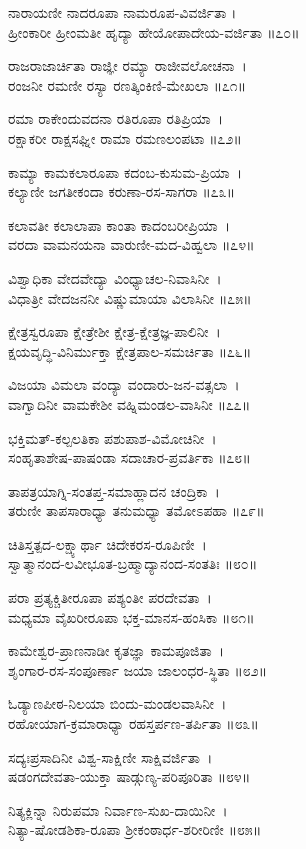 ನಾರಾಯಣೀ ನಾದರೂಪಾ ನಾಮರೂಪ-ವಿವರ್ಜಿತಾ ।\\
ಹ್ರೀಂಕಾರೀ ಹ್ರೀಂಮತೀ ಹೃದ್ಯಾ ಹೇಯೋಪಾದೇಯ-ವರ್ಜಿತಾ ॥೭೦॥

ರಾಜರಾಜಾರ್ಚಿತಾ ರಾಜ್ಞೀ ರಮ್ಯಾ ರಾಜೀವಲೋಚನಾ~।\\
ರಂಜನೀ ರಮಣೀ ರಸ್ಯಾ ರಣತ್ಕಿಂಕಿಣಿ-ಮೇಖಲಾ ॥೭೧॥

ರಮಾ ರಾಕೇಂದುವದನಾ ರತಿರೂಪಾ ರತಿಪ್ರಿಯಾ~।\\
ರಕ್ಷಾಕರೀ ರಾಕ್ಷಸಘ್ನೀ ರಾಮಾ ರಮಣಲಂಪಟಾ ॥೭೨॥

ಕಾಮ್ಯಾ ಕಾಮಕಲಾರೂಪಾ ಕದಂಬ-ಕುಸುಮ-ಪ್ರಿಯಾ~।\\
ಕಲ್ಯಾಣೀ ಜಗತೀಕಂದಾ ಕರುಣಾ-ರಸ-ಸಾಗರಾ ॥೭೩॥

ಕಲಾವತೀ ಕಲಾಲಾಪಾ ಕಾಂತಾ ಕಾದಂಬರೀಪ್ರಿಯಾ~।\\
ವರದಾ ವಾಮನಯನಾ ವಾರುಣೀ-ಮದ-ವಿಹ್ವಲಾ ॥೭೪॥

ವಿಶ್ವಾಧಿಕಾ ವೇದವೇದ್ಯಾ ವಿಂಧ್ಯಾಚಲ-ನಿವಾಸಿನೀ~।\\
ವಿಧಾತ್ರೀ ವೇದಜನನೀ ವಿಷ್ಣುಮಾಯಾ ವಿಲಾಸಿನೀ ॥೭೫॥

ಕ್ಷೇತ್ರಸ್ವರೂಪಾ ಕ್ಷೇತ್ರೇಶೀ ಕ್ಷೇತ್ರ-ಕ್ಷೇತ್ರಜ್ಞ-ಪಾಲಿನೀ~।\\
ಕ್ಷಯವೃದ್ಧಿ-ವಿನಿರ್ಮುಕ್ತಾ ಕ್ಷೇತ್ರಪಾಲ-ಸಮರ್ಚಿತಾ ॥೭೬॥

ವಿಜಯಾ ವಿಮಲಾ ವಂದ್ಯಾ ವಂದಾರು-ಜನ-ವತ್ಸಲಾ~।\\
ವಾಗ್ವಾದಿನೀ ವಾಮಕೇಶೀ ವಹ್ನಿಮಂಡಲ-ವಾಸಿನೀ ॥೭೭॥

ಭಕ್ತಿಮತ್-ಕಲ್ಪಲತಿಕಾ ಪಶುಪಾಶ-ವಿಮೋಚಿನೀ~।\\
ಸಂಹೃತಾಶೇಷ-ಪಾಷಂಡಾ ಸದಾಚಾರ-ಪ್ರವರ್ತಿಕಾ ॥೭೮॥

ತಾಪತ್ರಯಾಗ್ನಿ-ಸಂತಪ್ತ-ಸಮಾಹ್ಲಾದನ ಚಂದ್ರಿಕಾ~।\\
ತರುಣೀ ತಾಪಸಾರಾಧ್ಯಾ ತನುಮಧ್ಯಾ ತಮೋಽಪಹಾ ॥೭೯॥

ಚಿತಿಸ್ತತ್ಪದ-ಲಕ್ಷ್ಯಾರ್ಥಾ ಚಿದೇಕರಸ-ರೂಪಿಣೀ~।\\
ಸ್ವಾತ್ಮಾನಂದ-ಲವೀಭೂತ-ಬ್ರಹ್ಮಾದ್ಯಾನಂದ-ಸಂತತಿಃ ॥೮೦॥

ಪರಾ ಪ್ರತ್ಯಕ್ಚಿತೀರೂಪಾ ಪಶ್ಯಂತೀ ಪರದೇವತಾ~।\\
ಮಧ್ಯಮಾ ವೈಖರೀರೂಪಾ ಭಕ್ತ-ಮಾನಸ-ಹಂಸಿಕಾ ॥೮೧॥

ಕಾಮೇಶ್ವರ-ಪ್ರಾಣನಾಡೀ ಕೃತಜ್ಞಾ ಕಾಮಪೂಜಿತಾ~।\\
ಶೃಂಗಾರ-ರಸ-ಸಂಪೂರ್ಣಾ ಜಯಾ ಜಾಲಂಧರ-ಸ್ಥಿತಾ ॥೮೨॥

ಓಡ್ಯಾಣಪೀಠ-ನಿಲಯಾ ಬಿಂದು-ಮಂಡಲವಾಸಿನೀ~।\\
ರಹೋಯಾಗ-ಕ್ರಮಾರಾಧ್ಯಾ ರಹಸ್ತರ್ಪಣ-ತರ್ಪಿತಾ ॥೮೩॥

ಸದ್ಯಃಪ್ರಸಾದಿನೀ ವಿಶ್ವ-ಸಾಕ್ಷಿಣೀ ಸಾಕ್ಷಿವರ್ಜಿತಾ~।\\
ಷಡಂಗದೇವತಾ-ಯುಕ್ತಾ ಷಾಡ್ಗುಣ್ಯ-ಪರಿಪೂರಿತಾ ॥೮೪॥

ನಿತ್ಯಕ್ಲಿನ್ನಾ ನಿರುಪಮಾ ನಿರ್ವಾಣ-ಸುಖ-ದಾಯಿನೀ~।\\
ನಿತ್ಯಾ-ಷೋಡಶಿಕಾ-ರೂಪಾ ಶ್ರೀಕಂಠಾರ್ಧ-ಶರೀರಿಣೀ ॥೮೫॥

